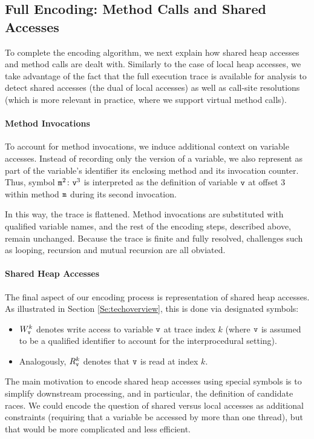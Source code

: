 \subsection{Full Encoding: Method Calls and Shared Accesses}

To complete the encoding algorithm, we next explain how shared heap accesses and method calls are dealt with. Similarly to the case of local heap accesses, we take advantage of the fact that the full execution trace is available for analysis to detect shared accesses (the dual of local accesses) as well as call-site resolutions (which is more relevant in practice, where we support virtual method calls).

\paragraph{Method Invocations} To account for method invocations, we induce additional context on variable accesses. Instead of recording only the version of a variable, we also represent as part of the variable's identifier its enclosing method and its invocation counter. Thus, symbol ${\tt m}^2 \colon {\tt v}^3$ is interpreted as the definition of variable ${\tt v}$ at offset 3 within method ${\tt m}$ during its second invocation. 

In this way, the trace is flattened. Method invocations are substituted with qualified variable names, and the rest of the encoding steps, described above, remain unchanged. Because the trace is finite and fully resolved, challenges such as looping, recursion and mutual recursion are all obviated.

\paragraph{Shared Heap Accesses} The final aspect of our encoding process is representation of shared heap accesses. As illustrated in Section \ref{Se:techoverview}, this is done via designated symbols:
\begin{itemize}
	\item $W^{k}_{\tt v}$ denotes write access to variable ${\tt v}$ at trace index $k$ (where ${\tt v}$ is assumed to be a qualified identifier to account for the interprocedural setting).
	\item Analogously, $R^{k}_{\tt v}$ denotes that ${\tt v}$ is read at index $k$.
\end{itemize}

The main motivation to encode shared heap accesses using special symbols is to simplify downstream processing, and in particular, the definition of candidate races. We could encode the question of shared versus local accesses as additional constraints (requiring that a variable be accessed by more than one thread), but that would be more complicated and less efficient.



